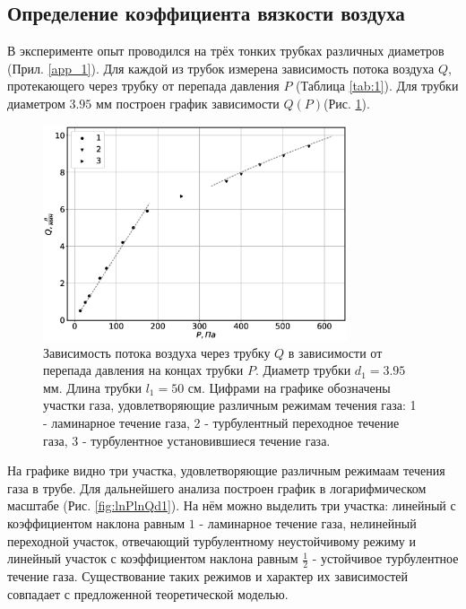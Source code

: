 \documentclass[12pt]{article}
\begin{document}
\subsection*{Определение коэффициента вязкости воздуха}
В эксперименте опыт проводился на трёх тонких трубках различных диаметров (Прил. \ref{app_1}). Для каждой 
из трубок измерена зависимость потока воздуха $Q$, протекающего через трубку от перепада давления $P$ (Таблица \ref{tab:1}).
Для трубки диаметром $3.95$ мм построен график зависимости $Q(P)$(Рис. \ref{fig:PQd1}).  
\begin{figure}[H]
    \centering
    \includegraphics[width=0.8\textwidth]{PQd1.eps}
    \caption{Зависимость потока воздуха через трубку $Q$ в зависимости от перепада давления на концах
        трубки $P$. Диаметр трубки $d_1 = 3.95$ мм. Длина трубки $l_1 = 50$ см. Цифрами на графике обозначены 
        участки газа, удовлетворяющие различным режимам течения газа: 
        1 - ламинарное течение газа,
        2 - турбулентный переходное течение газа, 
        3 - турбулентное установившиеся течение газа.}
    \label{fig:PQd1}
\end{figure}
На графике видно три участка, удовлетворяющие различным режимаам течения газа в трубе. Для дальнейшего 
анализа построен график в логарифмическом масштабе (Рис. \ref{fig:lnPlnQd1}). На нём можно выделить три участка:
линейный с коэффициентом наклона равным $1$ - ламинарное течение газа, нелинейный переходной участок, 
отвечающий турбулентному неустойчивому режиму и линейный участок с коэффициентом наклона равным $\frac{1}{2}$ - 
устойчивое турбулентное течение газа. Существование таких режимов и характер их зависимостей совпадает с 
предложенной теоретической моделью.  
\end{document}
